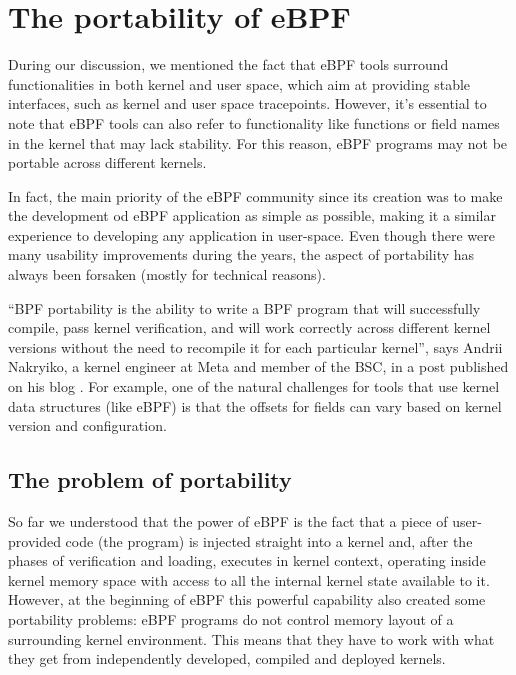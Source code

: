 \section{The portability of eBPF}

During our discussion, we mentioned the fact that eBPF tools surround functionalities in both kernel and user space, which aim at providing stable interfaces, such as kernel and user space tracepoints. 
However, it's essential to note that eBPF tools can also refer to functionality like functions or field names in the kernel that may lack stability. 
For this reason, eBPF programs may not be portable across different kernels.

In fact, the main priority of the eBPF community since its creation was to make the development od eBPF application as simple as possible, making it a similar experience to developing any application in user-space.
Even though there were many usability improvements during the years, the aspect of portability has always been forsaken (mostly for technical reasons).

``BPF portability is the ability to write a BPF program that will successfully compile, pass kernel verification, and will work correctly across different kernel versions without the need to recompile it for each particular kernel'', says Andrii Nakryiko, a kernel engineer at Meta and member of the BSC, in a post \cite{ANCOREPost} published on his blog \cite{ANBlog}.
For example, one of the natural challenges for tools that use kernel data structures (like eBPF) is that the offsets for fields can vary based on kernel version and configuration.

\subsection{The problem of portability}

So far we understood that the power of eBPF is the fact that a piece of user-provided code (the program) is injected straight into a kernel and, after the phases of verification and loading, executes in kernel context, operating inside kernel memory space with access to all the internal kernel state available to it. 
However, at the beginning of eBPF this powerful capability also created some portability problems: eBPF programs do not control memory layout of a surrounding kernel environment. 
This means that they have to work with what they get from independently developed, compiled and deployed kernels.

